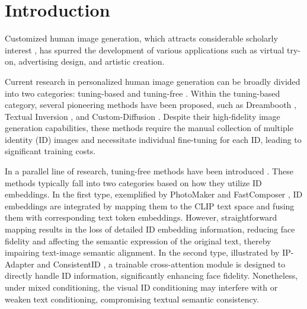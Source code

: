 \section{Introduction}

Customized human image generation, which attracts considerable scholarly interest \cite{ye2023ip,xiao2023fastcomposer,wu2024infinite,wang2024instantid,valevski2023face0,ruiz2023dreambooth,li2024photomaker,huang2024consistentid,gal2022image,chen2023photoverse}, has spurred the development of various applications such as virtual try-on, advertising design, and artistic creation. 

Current research in personalized human image generation can be broadly divided into two categories: tuning-based \cite{ruiz2023dreambooth,valevski2023face0,kumari2023multi,gal2022image} and tuning-free \cite{ye2023ip,xiao2023fastcomposer,li2024photomaker,wang2024instantid,huang2024consistentid,wu2024infinite,chen2023photoverse}. Within the tuning-based category, several pioneering methods have been proposed, such as Dreambooth \cite{ruiz2023dreambooth}, Textual Inversion \cite{gal2022image}, and Custom-Diffusion \cite{kumari2023multi}. Despite their high-fidelity image generation capabilities, these methods require the manual collection of multiple identity (ID) images and necessitate individual fine-tuning for each ID, leading to significant training costs.


In a parallel line of research, tuning-free methods have been introduced \cite{li2024photomaker, wang2024instantid, ye2023ip, huang2024consistentid}. These methods typically fall into two categories based on how they utilize ID embeddings. In the first type, exemplified by PhotoMaker \cite{li2024photomaker} and FastComposer \cite{xiao2023fastcomposer}, ID embeddings are integrated by mapping them to the CLIP text space and fusing them with corresponding text token embeddings. However, straightforward mapping results in the loss of detailed ID embedding information, reducing face fidelity and affecting the semantic expression of the original text, thereby impairing text-image semantic alignment. In the second type, illustrated by IP-Adapter \cite{ye2023ip} and ConsistentID \cite{huang2024consistentid}, a trainable cross-attention module is designed to directly handle ID information, significantly enhancing face fidelity. Nonetheless, under mixed conditioning, the visual ID conditioning may interfere with or weaken text conditioning, compromising textual semantic consistency. 

